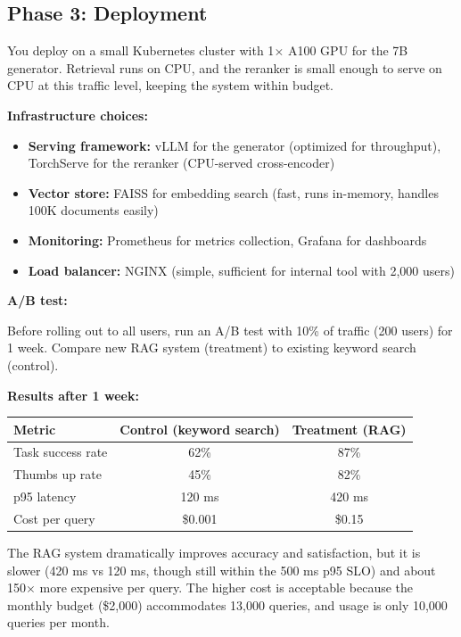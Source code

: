 \vspace{1em}

\subsection{Phase 3: Deployment}

You deploy on a small Kubernetes cluster with 1$\times$ A100 GPU for the 7B generator. Retrieval runs on CPU, and the reranker is small enough to serve on CPU at this traffic level, keeping the system within budget.

\textbf{Infrastructure choices:}

\begin{itemize}
\item \textbf{Serving framework:} vLLM for the generator (optimized for throughput), TorchServe for the reranker (CPU-served cross-encoder)
\item \textbf{Vector store:} FAISS for embedding search (fast, runs in-memory, handles 100K documents easily)
\item \textbf{Monitoring:} Prometheus for metrics collection, Grafana for dashboards
\item \textbf{Load balancer:} NGINX (simple, sufficient for internal tool with 2,000 users)
\end{itemize}

\textbf{A/B test:}

Before rolling out to all users, run an A/B test with 10\% of traffic (200 users) for 1 week. Compare new RAG system (treatment) to existing keyword search (control).

\textbf{Results after 1 week:}

\begin{center}
\begin{tabular}{lcc}
\textbf{Metric} & \textbf{Control (keyword search)} & \textbf{Treatment (RAG)} \\
\hline
Task success rate & 62\% & 87\% \\
Thumbs up rate & 45\% & 82\% \\
p95 latency & 120 ms & 420 ms \\
Cost per query & \$0.001 & \$0.15 \\
\end{tabular}
\end{center}

The RAG system dramatically improves accuracy and satisfaction, but it is slower (420 ms vs 120 ms, though still within the 500 ms p95 SLO) and about 150$\times$ more expensive per query. The higher cost is acceptable because the monthly budget (\$2,000) accommodates 13,000 queries, and usage is only 10,000 queries per month.

